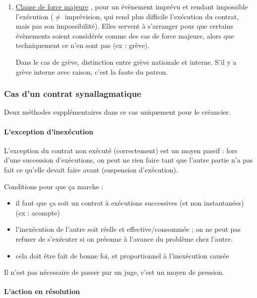 \begin{enumerate}
				
			
				\item \underline{Clause de force majeure} , pour un évènement imprévu et rendant impossible l'exécution ($\neq$ imprévision, qui rend plus difficile l'exécution du contrat, mais pas son impossibilité). Elles servent à s'arranger pour que certains évènements soient considérés comme des cas de force majeure, alors que techniquement ce n'en sont pas (ex : grève).
				
				Dans le cas de grève, distinction entre grève nationale et interne. S'il y a grève interne avec raison, c'est la faute du patron.
			\end{enumerate}			
			
			
			\subsubsection{Cas d'un contrat synallagmatique}
			
			Deux méthodes supplémentaires dans ce cas uniquement pour le créancier.
			
				\paragraph{L'exception d'inexécution}
			
				 L'exception du contrat non exécuté (correctement) est un moyen passif : lors d'une succession d'exécutions, on peut ne rien faire tant que l'autre partie n'a pas fait ce qu'elle devait faire avant (suspension d'exécution).
				
				Conditions pour que ça marche :
				
				\begin{itemize}
					\item il faut que ça soit un contrat à exécutions successives (et non instantanées) (ex : acompte)
					\item l'inexécution de l'autre soit réelle et effective/consommée ; on ne peut pas refuser de s'exécuter si on présume à l'avance du problème chez l'autre.
					\item cela doit être fait de bonne foi, et proportionnel à l'inexécution causée
				\end{itemize}
				
				Il n'est pas nécessaire de passer par un juge, c'est un moyen de pression.
				
				\paragraph{L'action en résolution}
				
